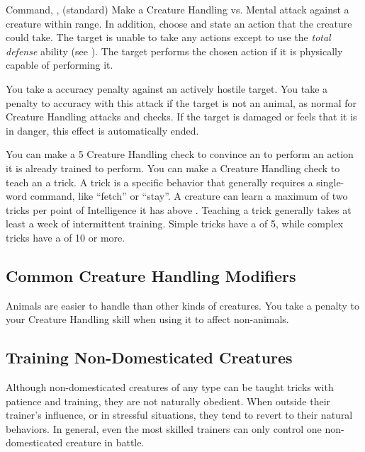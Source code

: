         \begin{sustainability}{Command}{, ,  (standard)}
            \label{Command}
            Make a Creature Handling vs. Mental attack against a creature within \rngmed range.
            In addition, choose and state an action that the creature could take.
            \hit The target is unable to take any actions except to use the \textit{total defense} ability (see ).
            \crit The target performs the chosen action if it is physically capable of performing it.
            
            You take a  accuracy penalty against an actively hostile target.
            You take a  penalty to accuracy with this attack if the target is not an animal, as normal for Creature Handling attacks and checks.
            If the target is damaged or feels that it is in danger, this effect is automatically ended.
        \end{sustainability}
         You can make a  5 Creature Handling check to convince an  to perform an action it is already trained to perform.
         You can make a Creature Handling check to teach an  a trick.
        A trick is a specific behavior that generally requires a single-word command, like ``fetch'' or ``stay''.
        A creature can learn a maximum of two tricks per point of Intelligence it has above .
        Teaching a trick generally takes at least a week of intermittent training.
        Simple tricks have a  of 5, while complex tricks have a  of 10 or more.

    \subsection{Common Creature Handling Modifiers}
        Animals are easier to handle than other kinds of creatures.
        You take a  penalty to your Creature Handling skill when using it to affect non-animals.

    \subsection{Training Non-Domesticated Creatures}
        Although non-domesticated creatures of any type can be taught tricks with patience and training, they are not naturally obedient.
        When outside their trainer's influence, or in stressful situations, they tend to revert to their natural behaviors.
        In general, even the most skilled trainers can only control one non-domesticated creature in battle.

